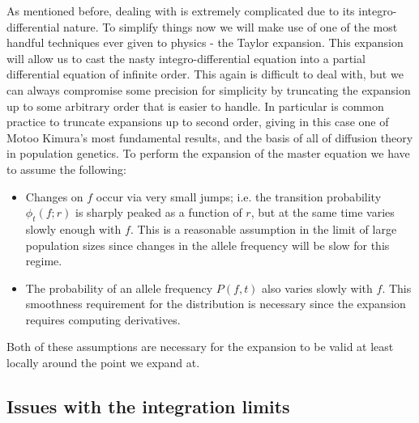 As mentioned before, dealing with  is extremely
complicated due to its integro-differential nature. To simplify things now we
will make use of one of the most handful techniques ever given to physics - the
Taylor expansion. This expansion will allow us to cast the nasty
integro-differential equation into a partial differential equation of infinite
order. This again is difficult to deal with, but we can always compromise some
precision for simplicity by truncating the expansion up to some arbitrary order
that is easier to handle. In particular is common practice to truncate
expansions up to second order, giving in this case one of Motoo Kimura's most
fundamental results, and the basis of all of diffusion theory in population
genetics. To perform the expansion of the master equation we have to assume the
following:
\begin{itemize}
  \item Changes on $f$ occur via very small jumps; i.e. the transition
  probability $\phi_t(f; r)$ is sharply peaked as a function of $r$, but at the
  same time varies slowly enough with $f$. This is a reasonable assumption in
  the limit of large population sizes since changes in the allele frequency will
  be slow for this regime.
  \item The probability of an allele frequency $P(f, t)$ also varies slowly with
  $f$. This smoothness requirement for the distribution is necessary since the
  expansion requires computing derivatives.
\end{itemize}
Both of these assumptions are necessary for the expansion to be valid at least
locally around the point we expand at.

\subsection{Issues with the integration limits}

